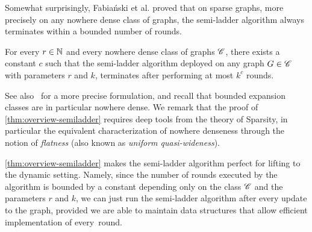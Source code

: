 Somewhat surprisingly, Fabia\'nski et al. proved that on sparse graphs, more precisely on any nowhere dense class of graphs, the semi-ladder algorithm always terminates within a bounded number of rounds.

\begin{theorem}\label{thm:overview-semiladder}
	For every $r\in \mathbb{N}$ and every nowhere dense class of graphs $\mathscr C$, there exists a constant $c$ such that the semi-ladder algorithm deployed on any graph $G\in \mathscr C$ with parameters $r$ and $k$, terminates after performing at most $k^c$ rounds.
\end{theorem}

See also~\cite{FabianskiPST19} for a more precise formulation, and recall that bounded expansion classes are in particular nowhere dense. We remark that the proof of \cref{thm:overview-semiladder} requires deep tools from the theory of Sparsity, in particular the equivalent characterization of nowhere denseness through the notion of \emph{flatness} (also known as \emph{uniform quasi-wideness}).

\cref{thm:overview-semiladder} makes the semi-ladder algorithm perfect for lifting to the dynamic setting. Namely, since the number of rounds executed by the algorithm is bounded by a constant depending only on the class $\mathscr C$ and the parameters $r$ and $k$, we can just run the semi-ladder algorithm after every update to the graph, provided we are able to maintain data structures that allow efficient implementation of every~round.

